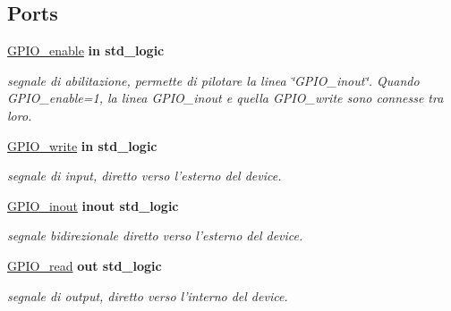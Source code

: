 \subsection*{Ports}
 \begin{DoxyCompactItemize}
\item 
\hypertarget{class_g_p_i_osingle_ga0ae7f62d9fa2c19d7ad2ad7574b58871}{\hyperlink{group___g_p_i_o-single_ga0ae7f62d9fa2c19d7ad2ad7574b58871}{G\+P\+I\+O\+\_\+enable}  {\bfseries {\bfseries \textcolor{vhdlchar}{in}\textcolor{vhdlchar}{ }}} {\bfseries \textcolor{vhdlchar}{std\+\_\+logic}\textcolor{vhdlchar}{ }} }\label{class_g_p_i_osingle_ga0ae7f62d9fa2c19d7ad2ad7574b58871}

\begin{DoxyCompactList}\small\item\em segnale di abilitazione, permette di pilotare la linea \char`\"{}\+G\+P\+I\+O\+\_\+inout\char`\"{}. Quando G\+P\+I\+O\+\_\+enable=1, la linea G\+P\+I\+O\+\_\+inout e quella G\+P\+I\+O\+\_\+write sono connesse tra loro. \end{DoxyCompactList}\item 
\hypertarget{class_g_p_i_osingle_ga20547939f304c722cb29df650d7ca7ef}{\hyperlink{group___g_p_i_o-single_ga20547939f304c722cb29df650d7ca7ef}{G\+P\+I\+O\+\_\+write}  {\bfseries {\bfseries \textcolor{vhdlchar}{in}\textcolor{vhdlchar}{ }}} {\bfseries \textcolor{vhdlchar}{std\+\_\+logic}\textcolor{vhdlchar}{ }} }\label{class_g_p_i_osingle_ga20547939f304c722cb29df650d7ca7ef}

\begin{DoxyCompactList}\small\item\em segnale di input, diretto verso l'esterno del device. \end{DoxyCompactList}\item 
\hypertarget{class_g_p_i_osingle_ga979707b3e6ce3920d653c07c91e80f70}{\hyperlink{group___g_p_i_o-single_ga979707b3e6ce3920d653c07c91e80f70}{G\+P\+I\+O\+\_\+inout}  {\bfseries {\bfseries \textcolor{vhdlchar}{inout}\textcolor{vhdlchar}{ }}} {\bfseries \textcolor{vhdlchar}{std\+\_\+logic}\textcolor{vhdlchar}{ }} }\label{class_g_p_i_osingle_ga979707b3e6ce3920d653c07c91e80f70}

\begin{DoxyCompactList}\small\item\em segnale bidirezionale diretto verso l'esterno del device. \end{DoxyCompactList}\item 
\hypertarget{class_g_p_i_osingle_ga4a6632a5d5cd6c4e6c1b634286795362}{\hyperlink{group___g_p_i_o-single_ga4a6632a5d5cd6c4e6c1b634286795362}{G\+P\+I\+O\+\_\+read}  {\bfseries {\bfseries \textcolor{vhdlchar}{out}\textcolor{vhdlchar}{ }}} {\bfseries \textcolor{vhdlchar}{std\+\_\+logic}\textcolor{vhdlchar}{ }} }\label{class_g_p_i_osingle_ga4a6632a5d5cd6c4e6c1b634286795362}

\begin{DoxyCompactList}\small\item\em segnale di output, diretto verso l'interno del device. \end{DoxyCompactList}\end{DoxyCompactItemize}


